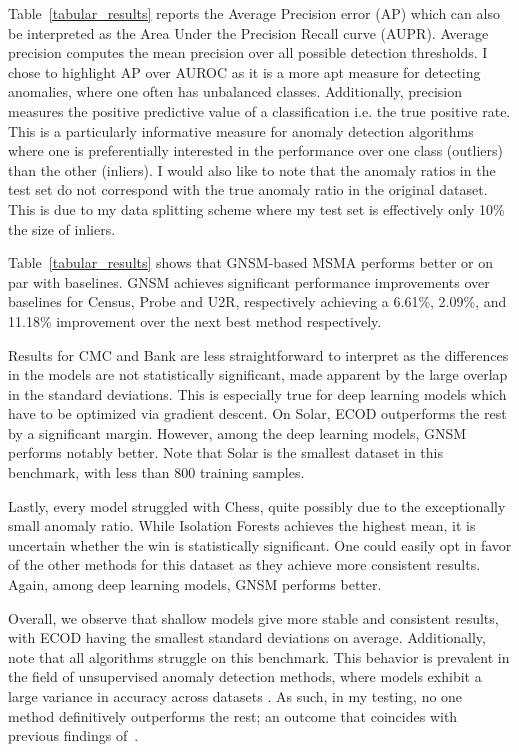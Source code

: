 Table~\ref{tabular_results} reports the Average Precision error (AP) which can also be interpreted as the Area Under the Precision Recall curve (AUPR).  Average precision computes the mean precision over all possible detection thresholds. I chose to highlight AP over AUROC as it is a more apt measure for detecting anomalies, where one often has unbalanced classes. Additionally, precision measures the positive predictive value of a classification i.e. the true positive rate. This is a particularly informative measure for anomaly detection algorithms where one is preferentially interested in the performance over one class (outliers) than the other (inliers). I would also like to note that the anomaly ratios in the test set do not correspond with the true anomaly ratio in the original dataset. This is due to my data splitting scheme where my test set is effectively only 10\% the size of inliers.

Table~\ref{tabular_results} shows that GNSM-based MSMA performs better or on par with baselines. GNSM achieves significant performance improvements over baselines for Census, Probe and U2R, respectively achieving a 6.61\%, 2.09\%, and 11.18\% improvement over the next best method respectively.

Results for CMC and Bank are less straightforward to interpret as the differences in the models are not statistically significant, made apparent by the large overlap in the standard deviations. This is especially true for deep learning models which have to be optimized via gradient descent. On Solar, ECOD outperforms the rest by a significant margin. However, among the deep learning models, GNSM performs notably better. Note that Solar is the smallest dataset in this benchmark, with less than 800 training samples.

Lastly, every model struggled with Chess, quite possibly due to the exceptionally small anomaly ratio. While Isolation Forests achieves the highest mean, it is uncertain whether the win is statistically significant. One could easily opt in favor of the other methods for this dataset as they achieve more consistent results. Again, among deep learning models, GNSM performs better.

Overall, we observe that shallow models give more stable and consistent results, with ECOD having the smallest standard deviations on average. Additionally, note that all algorithms struggle on this benchmark. This behavior is prevalent in the field of unsupervised anomaly detection methods, where models exhibit a large variance in accuracy across datasets \cite{han2022adbench}.
As such, in my testing, no one method definitively outperforms the rest; an outcome that coincides with previous findings of~\cite{han2022adbench, pang_deep_2021, ruff_unifying_2021}.

